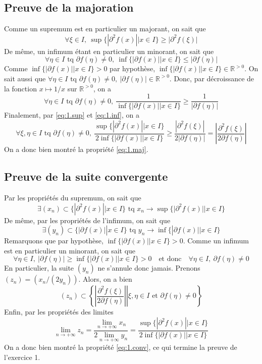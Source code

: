 \documentclass[a4paper, 12pt]{article}
\begin{document}
\subsection{Preuve de la majoration}

Comme un supremum est en particulier un majorant, on sait que
\begin{equation}
    \label{eq:1.sup}
    \forall \xi \in I,~ \sup \{ | \partial^2 f(x) || x \in I \} \geq |\partial^2 f(\xi)|
\end{equation}
De même, un infimum étant en particulier un minorant, on sait que
$$
\forall \eta \in I \text{ tq } \partial f(\eta) \neq 0,~ \inf \{ |\partial f(x)|| x \in I \} \leq |\partial f(\eta)|
$$
Comme \( \inf \{ |\partial f(x)|| x \in I \} > 0 \) par hypothèse, \( \inf \{ |\partial f(x)|| x \in I \} \in \mathbb{R}^{>0} \). On sait aussi que
\(\forall \eta \in I \text{ tq } \partial f(\eta) \neq 0,~ |\partial f(\eta)| \in \mathbb{R}^{>0} \).
Donc, par décroissance de la fonction \( x \mapsto 1/x \) sur \( \mathbb{R}^{>0} \), on a
\begin{equation}
    \label{eq:1.inf}
    \forall \eta \in I \text{ tq } \partial f(\eta) \neq 0,~ \frac{1}{\inf \{ |\partial f(x)|| x \in I \}} \geq \frac{1}{|\partial f(\eta)|}
\end{equation}
Finalement, par \eqref{eq:1.sup} et \eqref{eq:1.inf}, on a
$$
\forall \xi, \eta \in I \text{ tq } \partial f(\eta) \neq 0,~ \frac{\sup \{ | \partial^2 f(x) || x \in I \}}{2 \inf \{ |\partial f(x)|| x \in I \}}
\geq \frac{| \partial^2f(\xi)|}{2|\partial f(\eta)|}
= \left| \frac{\partial^2f(\xi)}{2\partial f(\eta)} \right|
$$
On a donc bien montré la propriété \eqref{eq:1.maj}.

\newpage

\subsection{Preuve de la suite convergente}

Par les propriétés du supremum, on sait que
$$
\exists (x_n) \subset \{ | \partial^2 f(x) || x \in I \} \text{ tq } x_n \to \sup \{ | \partial^2 f(x) || x \in I \}
$$
De même, par les propriétés de l'infimum, on sait que
$$
\exists (y_n) \subset \{ |\partial f(x)|| x \in I \} \text { tq } y_n \to \inf \{ |\partial f(x)|| x \in I \}
$$
Remarquons que par hypothèse, \( \inf\{|\partial f(x)| | x \in I\} > 0 \). Comme un infimum est en particulier un minorant, on sait que
$$
\forall \eta \in I,~ |\partial f(\eta)| \geq \inf\{|\partial f(x)| | x \in I\} > 0 \quad \text{et donc} \quad \forall \eta \in I,~ \partial f(\eta) \neq 0
$$
En particulier, la suite \( (y_n) \) ne s'annule donc jamais. Prenons \( (z_n) = (x_n/(2y_n)) \). Alors, on a bien
$$
(z_n) \subset
\left\{ \left. \left| \frac{\partial^2f(\xi)}{2\partial f(\eta)} \right| \right| \xi, \eta \in I \text{ et } \partial f(\eta) \neq 0 \right\}
$$
Enfin, par les propriétés des limites
$$
\lim_{n \to +\infty} z_n
= \frac{\lim_{n \to +\infty} x_n}{2 \lim_{n \to +\infty} y_n}
= \frac{\sup \{ | \partial^2 f(x) || x \in I \}}{2 \inf \{ |\partial f(x)|| x \in I \}}
$$
On a donc bien montré la propriété \eqref{eq:1.conv}, ce qui termine la preuve de l'exercice 1.
\end{document}
